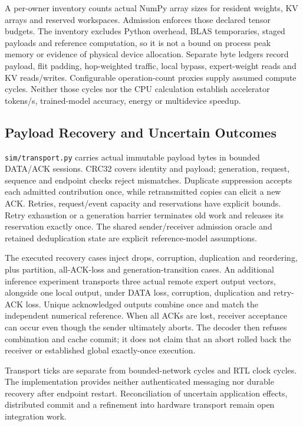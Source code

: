 \documentclass[11pt,a4paper]{article}
\begin{document}
A per-owner inventory counts actual NumPy array sizes for resident weights,
KV arrays and reserved workspaces. Admission enforces those declared tensor
budgets. The inventory excludes Python overhead, BLAS temporaries, staged
payloads and reference computation, so it is not a bound on process peak
memory or evidence of physical device allocation. Separate byte ledgers
record payload, flit padding, hop-weighted traffic, local bypass, expert-weight
reads and KV reads/writes. Configurable operation-count proxies supply assumed
compute cycles. Neither those cycles nor the CPU calculation establish
accelerator tokens/s, trained-model accuracy, energy or multidevice speedup.

\subsection{Payload Recovery and Uncertain Outcomes}

\texttt{sim/transport.py} carries actual immutable payload bytes in bounded
DATA/ACK sessions. CRC32 covers identity and payload; generation, request,
sequence and endpoint checks reject mismatches. Duplicate suppression accepts
each admitted contribution once, while retransmitted copies can elicit a new
ACK. Retries, request/event capacity and reservations have explicit bounds.
Retry exhaustion or a generation barrier terminates old work and releases
its reservation exactly once. The shared sender/receiver admission oracle
and retained deduplication state are explicit reference-model assumptions.

The executed recovery cases inject drops, corruption, duplication and
reordering, plus partition, all-ACK-loss and generation-transition cases.
An additional inference experiment transports three actual remote expert
output vectors, alongside one local output, under DATA loss, corruption,
duplication and retry-ACK loss. Unique acknowledged outputs combine once and
match the independent numerical reference. When all ACKs are lost, receiver
acceptance can occur even though the sender ultimately aborts. The decoder
then refuses combination and cache commit; it does not claim that an abort
rolled back the receiver or established global exactly-once execution.

Transport ticks are separate from bounded-network cycles and RTL clock cycles.
The implementation provides neither authenticated messaging nor durable
recovery after endpoint restart. Reconciliation of uncertain application
effects, distributed commit and a refinement into hardware transport remain
open integration work.
\end{document}
